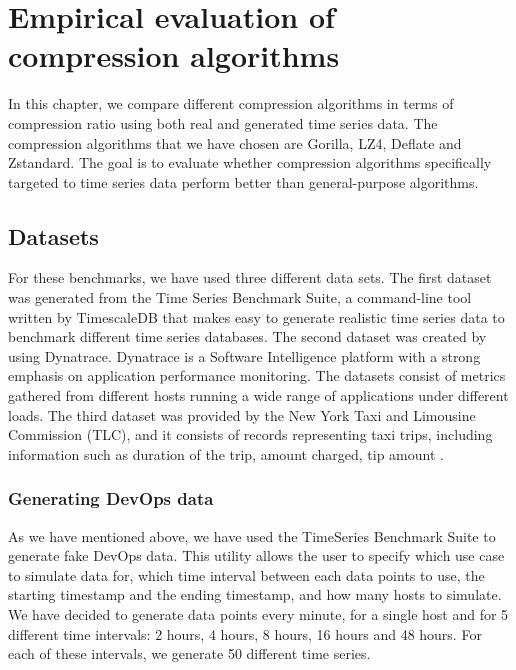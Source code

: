 
\chapter{Empirical evaluation of compression algorithms}
In this chapter, we compare different compression algorithms in terms of compression ratio using both real
and generated time series data. The compression algorithms that we have chosen are Gorilla, LZ4,
Deflate and Zstandard. The goal is to evaluate whether compression algorithms specifically
targeted to time series data perform better than general-purpose algorithms.

\section{Datasets}
For these benchmarks, we have used three different data sets. The first dataset was generated from the
Time Series Benchmark Suite, a command-line tool written by TimescaleDB \cite{timescale_2019_timescaletsbs} that makes
easy to generate realistic time series data to benchmark different time series databases.
The second dataset was created by using Dynatrace. Dynatrace is a Software Intelligence platform with a strong
emphasis on application performance monitoring. The datasets consist of metrics gathered from
different hosts running a wide range of applications under different loads.
The third dataset was provided by the New York Taxi and Limousine Commission (TLC), and it consists
of records representing taxi trips, including information such as duration of the trip, amount
charged, tip amount \cite{tlc2019_dataset}.

\subsection{Generating DevOps data}
As we have mentioned above, we have used the TimeSeries Benchmark Suite to generate fake DevOps data.
This utility allows the user to specify which use case to simulate data for, which time interval between each data points
to use, the starting timestamp and the ending timestamp, and how many hosts to simulate.
We have decided to generate data points every minute, for a single host and for 5 different time intervals:
2 hours, 4 hours, 8 hours, 16 hours and 48 hours. For each of these intervals, we generate 50 different time series.

